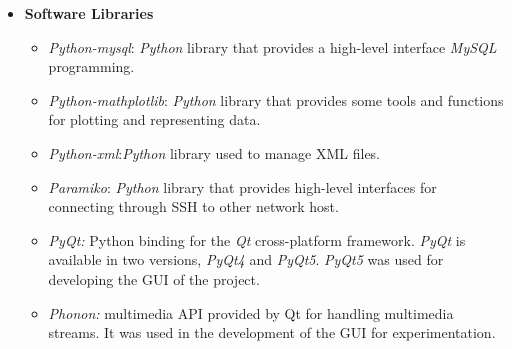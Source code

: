 \begin{itemize}
\item \textbf{Software Libraries}

\begin{itemize}
\item{\emph{Python-mysql}}: \emph{Python} library that provides a high-level interface
  \emph{MySQL} programming. 
\item{\emph{Python-mathplotlib}}: \emph{Python} library that provides some tools and
  functions for plotting and representing data. 
\item{\emph{Python-xml}}:\emph{Python} library used to manage \ac{XML} files.
\item{\emph{Paramiko}}: \emph{Python} library that provides high-level interfaces for
  connecting through \ac{SSH} to other network host. 
\item \emph{PyQt:} Python binding for the \emph{Qt} cross-platform framework. \emph{PyQt} is
  available in two versions, \emph{PyQt4} and \emph{PyQt5}. \emph{PyQt5} was
  used for developing the \acs{GUI} of the project. 
\item \emph{Phonon:} multimedia \ac{API} provided by Qt for handling multimedia
  streams. It was used in the development of the \ac{GUI} for experimentation.
\end{itemize}
\end{itemize}
